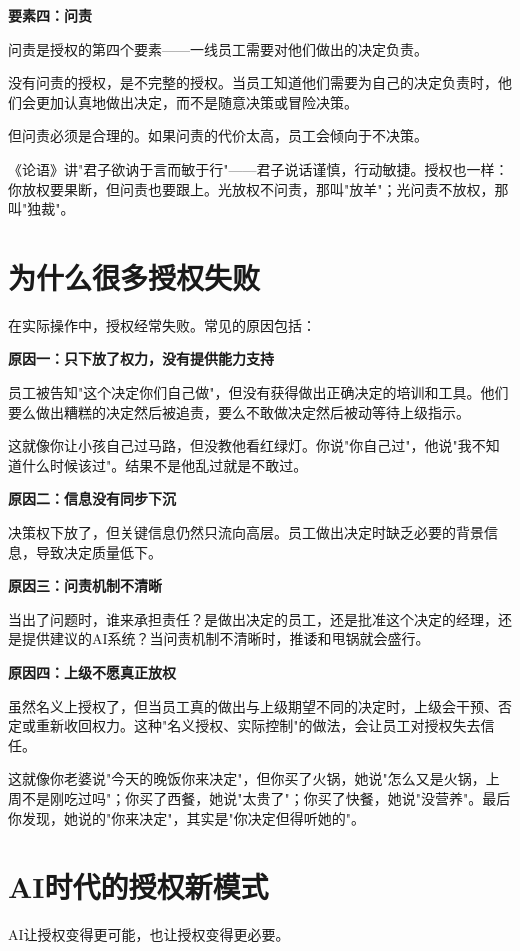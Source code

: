 \textbf{要素四：问责}

问责是授权的第四个要素——一线员工需要对他们做出的决定负责。

没有问责的授权，是不完整的授权。当员工知道他们需要为自己的决定负责时，他们会更加认真地做出决定，而不是随意决策或冒险决策。

但问责必须是合理的。如果问责的代价太高，员工会倾向于不决策。

《论语》讲"君子欲讷于言而敏于行"——君子说话谨慎，行动敏捷。授权也一样：你放权要果断，但问责也要跟上。光放权不问责，那叫"放羊"；光问责不放权，那叫"独裁"。

\section{为什么很多授权失败}


在实际操作中，授权经常失败。常见的原因包括：

\textbf{原因一：只下放了权力，没有提供能力支持}

员工被告知"这个决定你们自己做"，但没有获得做出正确决定的培训和工具。他们要么做出糟糕的决定然后被追责，要么不敢做决定然后被动等待上级指示。

这就像你让小孩自己过马路，但没教他看红绿灯。你说"你自己过"，他说"我不知道什么时候该过"。结果不是他乱过就是不敢过。

\textbf{原因二：信息没有同步下沉}

决策权下放了，但关键信息仍然只流向高层。员工做出决定时缺乏必要的背景信息，导致决定质量低下。

\textbf{原因三：问责机制不清晰}

当出了问题时，谁来承担责任？是做出决定的员工，还是批准这个决定的经理，还是提供建议的AI系统？当问责机制不清晰时，推诿和甩锅就会盛行。

\textbf{原因四：上级不愿真正放权}

虽然名义上授权了，但当员工真的做出与上级期望不同的决定时，上级会干预、否定或重新收回权力。这种"名义授权、实际控制"的做法，会让员工对授权失去信任。

这就像你老婆说"今天的晚饭你来决定"，但你买了火锅，她说"怎么又是火锅，上周不是刚吃过吗"；你买了西餐，她说"太贵了"；你买了快餐，她说"没营养"。最后你发现，她说的"你来决定"，其实是"你决定但得听她的"。

\section{AI时代的授权新模式}


AI让授权变得更可能，也让授权变得更必要。

